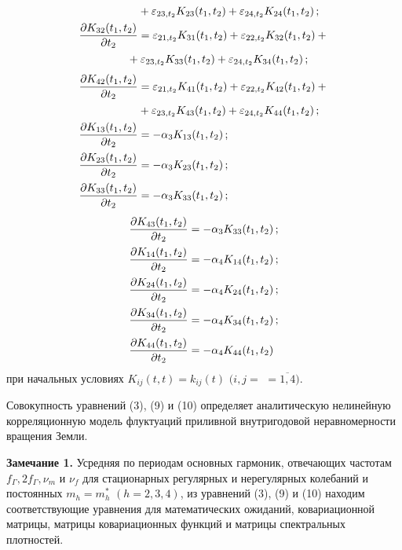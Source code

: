 \begin{multicols}{2}
\begin{align}
  & {}+\eps_{23, t_2} K_{23} (t_1, t_2) + \eps_{24, t_2} K_{24} (t_1, t_2)\,;\notag\\
 \fr{\prt K_{32} (t_1, t_2)}{ \prt t_2} &=\eps_{21,t_2} K_{31} (t_1, t_2) +\eps_{22, t_2} K_{32} (t_1, t_2) +{}\notag\\
  & \hspace*{-10pt}{}+\eps_{23, t_2} K_{33} (t_1, t_2) + \eps_{24, t_2} K_{34} (t_1, t_2)\,;\notag\\[-6pt]
&\label{e18}\\[-6pt]
 \fr{\prt K_{42} (t_1, t_2)}{ \prt t_2} &=\eps_{21,t_2} K_{41} (t_1, t_2) +\eps_{22, t_2} K_{42} (t_1, t_2) +{}\notag\\
  & {}+\eps_{23, t_2} K_{43} (t_1, t_2) + \eps_{24, t_2} K_{44} (t_1, t_2)\,;\notag\\
 \fr{\prt K_{13} (t_1, t_2)}{ \prt t_2} &=-\alp_3 K_{13} (t_1, t_2)\,;\notag\\
 \fr{\prt K_{23} (t_1, t_2)}{ \prt t_2} &=-\alp_3 K_{23} (t_1, t_2)\,;\notag\\
 \fr{\prt K_{33} (t_1, t_2)}{ \prt t_2} &=-\alp_3 K_{33} (t_1, t_2)\,;\notag
\end{align}
\begin{align}
 \displaystyle\frac{\displaystyle \partial K_{43} (t_1, t_2)\mathstrut}{\displaystyle  \partial t_2\mathstrut} &=-\alpha_3 K_{33} (t_1, t_2)\,;\notag\\
 \displaystyle\frac{\displaystyle \partial K_{14} (t_1, t_2)\mathstrut}{\displaystyle  \partial t_2\mathstrut} &=-\alpha_4 K_{14} (t_1, t_2)\,;\notag\\
 \displaystyle\frac{\displaystyle \partial K_{24} (t_1, t_2)\mathstrut}{\displaystyle  \partial t_2\mathstrut} &=-\alpha_4 K_{24} (t_1, t_2)\,;\notag\\
 \displaystyle\frac{\displaystyle \partial K_{34} (t_1, t_2)\mathstrut}{\displaystyle  \partial t_2\mathstrut} &=-\alpha_4 K_{34} (t_1, t_2)\,;\notag\\
 \displaystyle\frac{\displaystyle \partial K_{44} (t_1, t_2)\mathstrut}{\displaystyle  \partial t_2\mathstrut} &=-\alpha_4 K_{44} (t_1, t_2)\notag
\end{align}
при начальных условиях $K_{ij}(t,t) = k_{ij}(t)$ $(i,j=$\linebreak
$=\overline{1,4})$.

Совокупность уравнений (3), (9) и (10) определяет аналитическую
нелинейную корреляционную модель флуктуаций приливной внутригодовой
неравномерности вращения Земли.

{\small
\medskip
\textbf{ Замечание 1.} Усредняя по периодам основных
гармоник, отвечающих частотам $f_\Gamma, 2f_\Gamma, \nu_m$ и $\nu_f$
для стационарных регулярных и нерегулярных колебаний и постоянных
$m_h = m_h^*$ $(h= 2,3,4)$, из уравнений (3), (9) и (10) находим
соответствующие уравнения для математических ожиданий,
ковариационной матрицы, матрицы ковариационных функций и матрицы
спектральных плотностей.

}
\end{multicols}
